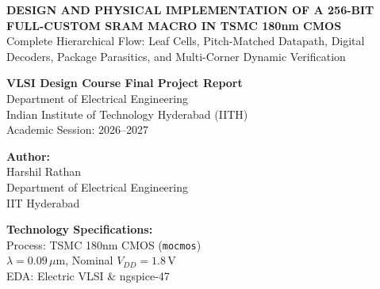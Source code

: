 \documentclass[10pt,a4paper,titlepage]{article}
\begin{document}
\begin{titlepage}
    \centering
    \vspace*{0.5cm}
    
    {\Huge\textbf{\sffamily\color{navy} DESIGN AND PHYSICAL IMPLEMENTATION OF A 256-BIT FULL-CUSTOM SRAM MACRO IN TSMC 180nm CMOS}}\\[1.2em]
    {\Large\sffamily\color{slate} Complete Hierarchical Flow: Leaf Cells, Pitch-Matched Datapath, Digital Decoders, Package Parasitics, and Multi-Corner Dynamic Verification}\\[2.5em]
    
    \begin{tcolorbox}[colback=slate!4,colframe=navy!60,arc=3mm,width=0.92\textwidth]
        \centering\vspace{0.4em}
        {\large\textbf{\sffamily VLSI Design Course Final Project Report}}\\[0.3em]
        {\normalsize\sffamily Department of Electrical Engineering}\\[0.2em]
        {\normalsize\sffamily Indian Institute of Technology Hyderabad (IITH)}\\[0.3em]
        {\small\sffamily Academic Session: 2026--2027}\vspace{0.4em}
    \end{tcolorbox}
    
    \vspace{2.5cm}
    
    \begin{minipage}{0.48\textwidth}
        \large
        \textbf{\sffamily Author:}\\
        Harshil Rathan\\
        Department of Electrical Engineering\\
        IIT Hyderabad
    \end{minipage}
    \hfill
    \begin{minipage}{0.48\textwidth}
        \large\raggedleft
        \textbf{\sffamily Technology Specifications:}\\
        Process: TSMC 180nm CMOS (\texttt{mocmos})\\
        $\lambda = 0.09\,\mu\text{m}$, Nominal $V_{DD} = 1.8\,\text{V}$\\
        EDA: Electric VLSI \& ngspice-47
    \end{minipage}
    

\end{titlepage}
\end{document}

